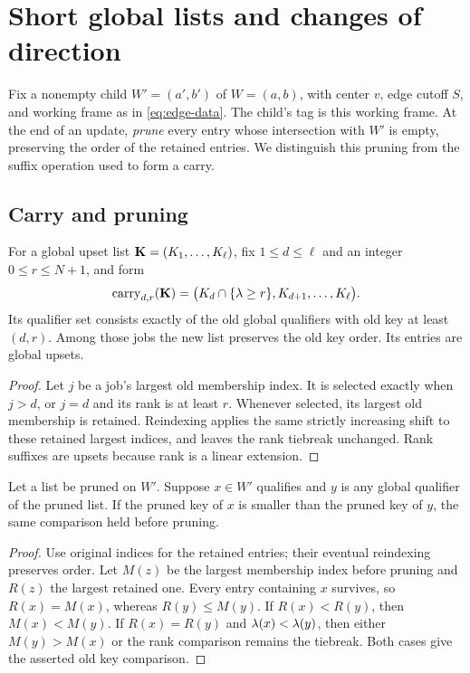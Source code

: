 \section{Short global lists and changes of direction}\label{sec:lists}

Fix a nonempty child \(W'=(a',b')\) of \(W=(a,b)\), with center
\(v\), edge cutoff \(S\), and working frame as in
\eqref{eq:edge-data}. The child's tag is this working frame.
At the end of an update, \emph{prune} every entry whose intersection
with \(W'\) is empty, preserving the order of the retained entries.
We distinguish this pruning from the suffix operation used to form a
carry.

\subsection{Carry and pruning}

\begin{lemma}\label{lem:carry}
For a global upset list \(\mathbf K=(K_1,\ldots,K_\ell)\), fix
\(1\le d\le\ell\) and an integer \(0\le r\le N+1\), and form
\begin{equation}
 \operatorname{carry}_{d,r}(\mathbf K)
 =\bigl(K_d\cap\{\lambda\ge r\},K_{d+1},\ldots,K_\ell\bigr).
 \label{eq:carry}
\end{equation}
Its qualifier set consists exactly of the old global qualifiers with
old key at least \((d,r)\). Among those jobs the new list preserves
the old key order. Its entries are global upsets.
\end{lemma}
\begin{proof}
Let \(j\) be a job's largest old membership index. It is selected
exactly when \(j>d\), or \(j=d\) and its rank is at least \(r\).
Whenever selected, its largest old membership is retained.
Reindexing applies the same strictly increasing shift to these retained
largest indices, and leaves the rank tiebreak unchanged. Rank suffixes
are upsets because rank is a linear extension.
\end{proof}

\begin{lemma}\label{lem:prune}
Let a list be pruned on \(W'\). Suppose \(x\in W'\) qualifies
and \(y\) is any global qualifier of the pruned list. If the pruned
key of \(x\) is smaller than the pruned key of \(y\), the same
comparison held before pruning.
\end{lemma}
\begin{proof}
Use original indices for the retained entries; their eventual
reindexing preserves order. Let \(M(z)\) be the largest membership
index before pruning and \(R(z)\) the largest retained one.
Every entry containing \(x\) survives, so \(R(x)=M(x)\), whereas
\(R(y)\le M(y)\). If \(R(x)<R(y)\), then
\(M(x)<M(y)\). If \(R(x)=R(y)\) and \(\lambda(x)<\lambda(y)\),
then either \(M(y)>M(x)\) or the rank comparison remains the
tiebreak. Both cases give the asserted old key comparison.
\end{proof}

